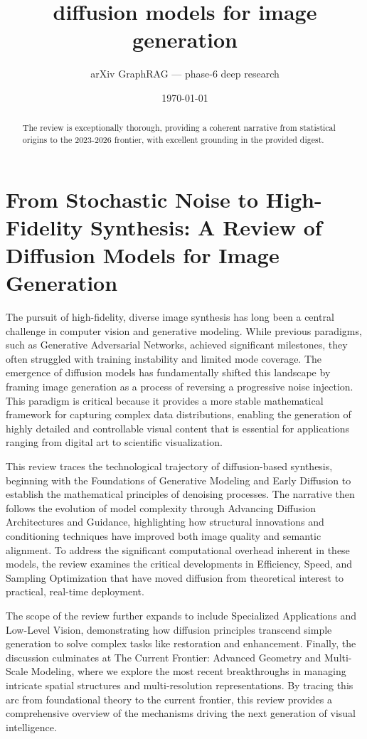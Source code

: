 \documentclass[11pt]{article}
\title{diffusion models for image generation}
\author{arXiv GraphRAG --- phase-6 deep research}
\date{\today}
\begin{document}
\maketitle

\begin{abstract}
The review is exceptionally thorough, providing a coherent narrative from statistical origins to the 2023-2026 frontier, with excellent grounding in the provided digest.
\end{abstract}

\section{From Stochastic Noise to High-Fidelity Synthesis: A Review of Diffusion Models for Image Generation}

The pursuit of high-fidelity, diverse image synthesis has long been a central challenge in computer vision and generative modeling. While previous paradigms, such as Generative Adversarial Networks, achieved significant milestones, they often struggled with training instability and limited mode coverage. The emergence of diffusion models has fundamentally shifted this landscape by framing image generation as a process of reversing a progressive noise injection. This paradigm is critical because it provides a more stable mathematical framework for capturing complex data distributions, enabling the generation of highly detailed and controllable visual content that is essential for applications ranging from digital art to scientific visualization.

This review traces the technological trajectory of diffusion-based synthesis, beginning with the Foundations of Generative Modeling and Early Diffusion to establish the mathematical principles of denoising processes. The narrative then follows the evolution of model complexity through Advancing Diffusion Architectures and Guidance, highlighting how structural innovations and conditioning techniques have improved both image quality and semantic alignment. To address the significant computational overhead inherent in these models, the review examines the critical developments in Efficiency, Speed, and Sampling Optimization that have moved diffusion from theoretical interest to practical, real-time deployment.

The scope of the review further expands to include Specialized Applications and Low-Level Vision, demonstrating how diffusion principles transcend simple generation to solve complex tasks like restoration and enhancement. Finally, the discussion culminates at The Current Frontier: Advanced Geometry and Multi-Scale Modeling, where we explore the most recent breakthroughs in managing intricate spatial structures and multi-resolution representations. By tracing this arc from foundational theory to the current frontier, this review provides a comprehensive overview of the mechanisms driving the next generation of visual intelligence.
\end{document}
